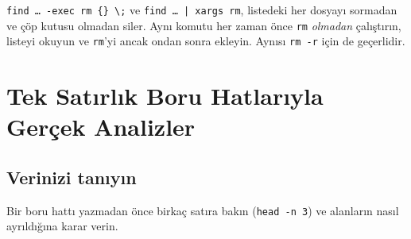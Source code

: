 \documentclass[11pt,a4paper]{article}
\newcommand{\cmd}[1]{\texttt{#1}}
\begin{document}
\begin{tryit}
\cmd{find \dots{} -exec rm \{\} \textbackslash;} ve \cmd{find \dots{} | xargs rm}, listedeki her dosyayı sormadan ve çöp kutusu olmadan siler. Aynı komutu her zaman önce \cmd{rm} \emph{olmadan} çalıştırın, listeyi okuyun ve \cmd{rm}'yi ancak ondan sonra ekleyin. Aynısı \cmd{rm -r} için de geçerlidir.
\end{tryit}

\section{Tek Satırlık Boru Hatlarıyla Gerçek Analizler}
\label{sec:analysis}

\subsection{Verinizi tanıyın}

Bir boru hattı yazmadan önce birkaç satıra bakın (\cmd{head -n 3}) ve alanların nasıl ayrıldığına karar verin.
\end{document}

